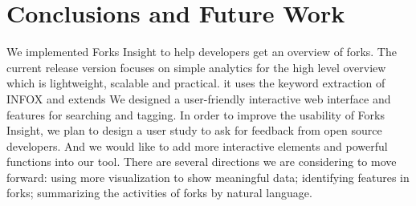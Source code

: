 \section{Conclusions and Future Work}
We implemented Forks Insight to help developers get an overview of forks. The current release version focuses on simple analytics for the high level overview which is lightweight, scalable and practical. it uses the keyword extraction of INFOX and extends We designed a user-friendly interactive web interface and features for searching and tagging. In order to improve the usability of Forks Insight, we plan to design a user study to ask for feedback from open source developers. And we would like to add more interactive elements and powerful functions into our tool. There are several directions we are considering to move forward: using more visualization to show meaningful data; identifying features in forks; summarizing the activities of forks by natural language.

\iffalse
\begin{acks}
  TODO
\end{acks}
\fi

